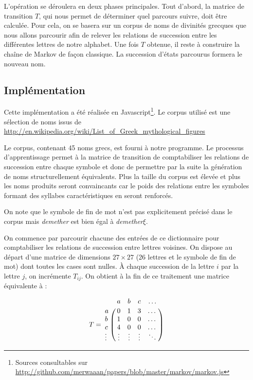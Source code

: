 \documentclass[12pt]{article}
\begin{document}
L'opération se déroulera en deux phases principales. Tout d'abord, la
matrice de transition $T$, qui nous permet de déterminer quel parcours
suivre, doit être calculée. Pour cela, on se basera sur un corpus de
noms de divinités grecques que nous allons parcourir afin de relever
les relations de succession entre les différentes lettres de notre
alphabet. Une fois $T$ obtenue, il reste à construire la chaîne de
Markov de façon classique. La succession d'états parcourus formera le
nouveau nom.

\subsection{Implémentation}

Cette implémentation a été réalisée en Javascript\footnote{Sources
  consultables sur
  \url{http://github.com/merwaaan/papers/blob/master/markov/markov.js}}. Le
corpus utilisé est une sélection de noms issus de
\url{http://en.wikipedia.org/wiki/List_of_Greek_mythological_figures}

Le corpus, contenant 45 noms grecs, est fourni à notre programme. Le
processus d'apprentissage permet à la matrice de transition de
comptabiliser les relations de succession entre chaque symbole et donc
de permettre par la suite la génération de noms structurellement
équivalents. Plus la taille du corpus est élevée et plus les noms
produits seront convaincants car le poids des relations entre les
symboles formant des syllabes caractéristiques en seront renforcés.



On note que le symbole de fin de mot n'est pas explicitement précisé
dans le corpus mais \textit{demether} est bien égal à
\textit{demether}$\xi$.

On commence par parcourir chacune des entrées de ce dictionnaire pour
comptabiliser les relations de succession entre lettres voisines. On
dispose au départ d'une matrice de dimensions $27 \times 27$ (26
lettres et le symbole de fin de mot) dont toutes les cases sont
nulles. \`A chaque succession de la lettre $i$ par la lettre $j$, on
incrémente $T_{ij}$. On obtient à la fin de ce traitement une matrice
équivalente à :

$$
T = \bordermatrix{
    & a & b & c & \dots \cr
  a & 0 & 1 & 3 & \dots \cr
  b & 1 & 0 & 0 & \dots \cr
  c & 4 & 0 & 0 & \dots \cr
  \vdots & \vdots & \vdots & \vdots & \ddots \cr
}
$$
\vspace{0.5cm}
\end{document}
